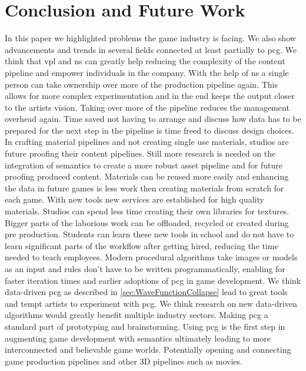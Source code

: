 \documentclass[10pt,a4paper]{article}
\begin{document}
\section{Conclusion and Future Work}
\begin{multicols}{2}
In this paper we highlighted problems the game industry is facing. We also show advancements and trends in several fields connected at least partially to \gls{pcg}. We think that \gls{vpl} and \gls{ns} can greatly help reducing the complexity of the content pipeline and empower individuals in the company. With the help of \gls{ns} a single person can take ownership over more of the production pipeline again. This allows for more complex experimentation and in the end keeps the output closer to the artists vision. Taking over more of the pipeline reduces the management overhead again. Time saved not having to arrange and discuss how data has to be prepared for the next step in the pipeline is time freed to discuss design choices. In crafting material pipelines and not creating single use materials, studios are future proofing their content pipelines. Still more research is needed on the integration of semantics to create a more robust asset pipeline and for future proofing produced content. Materials can be reused more easily and enhancing the data in future games is less work then creating materials from scratch for each game. With new tools new services are established for high quality materials. Studios can spend less time creating their own libraries for textures. Bigger parts of the laborious work can be offloaded, recycled or created during pre production. Students can learn these new tools in school and do not have to learn significant parts of the workflow after getting hired, reducing the time needed to teach employees. Modern procedural algorithms take images or models as an input and rules don’t have to be written programmatically, enabling for faster iteration times and earlier adoptions of \gls{pcg} in game development. We think data-driven \gls{pcg} as described in  \autoref{sec:WaveFunctionCollapse} lead to great tools and tempt artists to experiment with \gls{pcg}. We think research on new data-driven algorithms would greatly benefit multiple industry sectors. Making \gls{pcg} a standard part of prototyping and brainstorming. Using \gls{pcg} is the first step in augmenting game development with semantics ultimately leading to more interconnected and believable game worlds. Potentially opening and connecting game production pipelines and other 3D pipelines such as movies.
\end{multicols}
\end{document}
